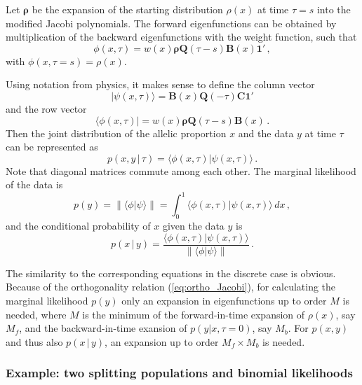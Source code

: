 \documentclass[preprint]{elsarticle}
\newcommand{\bs}[1]{\ensuremath{\boldsymbol{#1}}}
\newcommand\given{{\,|\,}}
\newcommand{\norm}[1]{\left\lVert#1\right\rVert}
\newcommand\oneC{\ensuremath{\mathbf{1}'}}
\begin{document}
Let $\bs{\rho}$ be the expansion of the starting distribution $\rho(x)$ at time $\tau=s$ into the modified Jacobi polynomials. The forward eigenfunctions can be obtained by multiplication of the backward eigenfunctions with the weight function, such that 
\begin{equation}
\phi(x,\tau)=w(x)\bs{\rho}\mathbf{Q}(\tau-s)\mathbf{B}(x)\oneC\,,
\end{equation}
with $\phi(x,\tau=s)=\rho(x)$.

Using notation from physics, it makes sense to define the column vector
\begin{equation}
|\psi(x,\tau)\rangle=\mathbf{B}(x)\mathbf{Q}(-\tau)\mathbf{C}\oneC
\end{equation}
and the row vector
\begin{equation}
\langle\phi(x,\tau)|=w(x)\bs{\rho}\mathbf{Q}(\tau-s)\mathbf{B}(x)\,.
\end{equation}
Then the joint distribution of the allelic proportion $x$ and the data $y$ at time $\tau$ can be represented as
\begin{equation}
p(x,y\given \tau)=\langle\phi(x,\tau)|\psi(x,\tau)\rangle\,.
\end{equation}
Note that diagonal matrices commute among each other. The marginal likelihood of the data is
\begin{equation}
p(y)=\norm{\langle\phi|\psi\rangle}=\int_0^1 \langle\phi(x,\tau)|\psi(x,\tau)\rangle\,dx\,,
\end{equation}
and the conditional probability of $x$ given the data $y$ is
\begin{equation}
p(x\given y)=\frac{\langle\phi(x,\tau)|\psi(x,\tau)\rangle}{\norm{\langle\phi|\psi\rangle}}\,.
\end{equation}

The similarity to the corresponding equations in the discrete case is obvious. Because of the orthogonality relation (\ref{eq:ortho_Jacobi}), for calculating the marginal likelihood $p(y)$ only an expansion in eigenfunctions up to order $M$ is needed, where $M$ is the minimum of the forward-in-time expansion of $\rho(x)$, say $M_f$, and the backward-in-time exansion of $p(y|x,\tau=0)$, say $M_b$. For $p(x,y)$ and thus also $p(x\given y)$, an expansion up to order $M_f\times M_b$ is needed.


\subsubsection{Example: two splitting populations and binomial likelihoods}
\end{document}
